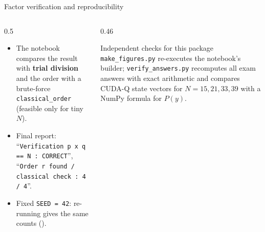 \documentclass[aspectratio=169,11pt]{beamer}
\newcommand{\key}[1]{{\color{qdark}\textbf{#1}}}
\begin{document}
\begin{frame}[label=fVerify]{Factor verification and reproducibility}
  \small
  \begin{columns}[T]
    \begin{column}{0.5\textwidth}
      \begin{itemize}\itemsep2pt
        \item The notebook compares the result with \key{trial division} and the order with a brute-force \texttt{classical\_order} (feasible only for tiny $N$).
        \item Final report: ``\texttt{Verification p x q == N : CORRECT}'', ``\texttt{Order r found / classical check : 4 / 4}''.
        \item Fixed \texttt{SEED = 42}: re-running gives the same counts (\numreproduced).
      \end{itemize}
    \end{column}
    \begin{column}{0.46\textwidth}
      \begin{block}{Independent checks for this package}
        \scriptsize \texttt{make\_figures.py} re-executes the notebook's builder; \texttt{verify\_answers.py} recomputes all exam answers with exact
        arithmetic and compares CUDA-Q state vectors for $N = 15, 21, 33, 39$ with a NumPy formula for $P(y)$.
      \end{block}
    \end{column}
  \end{columns}
\end{frame}

\end{document}
